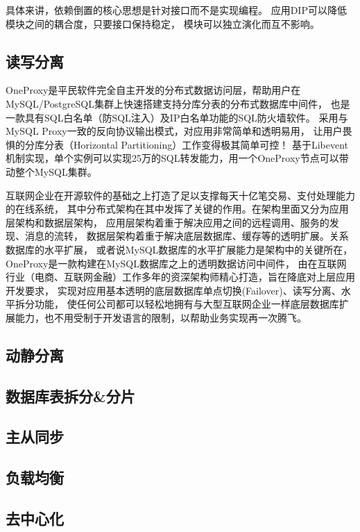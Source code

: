 \documentclass{book}
\begin{document}
具体来讲，依赖倒置的核心思想是针对接口而不是实现编程。
应用DIP可以降低模块之间的耦合度，只要接口保持稳定，
模块可以独立演化而互不影响。

\subsection{读写分离}

OneProxy是平民软件完全自主开发的分布式数据访问层，帮助用户在MySQL/PostgreSQL集群上快速搭建支持分库分表的分布式数据库中间件，
也是一款具有SQL白名单（防SQL注入）及IP白名单功能的SQL防火墙软件。
采用与MySQL Proxy一致的反向协议输出模式，对应用非常简单和透明易用，
让用户畏惧的分库分表（Horizontal Partitioning）工作变得极其简单可控！
基于Libevent机制实现，单个实例可以实现25万的SQL转发能力，用一个OneProxy节点可以带动整个MySQL集群。

互联网企业在开源软件的基础之上打造了足以支撑每天十亿笔交易、支付处理能力的在线系统，
其中分布式架构在其中发挥了关键的作用。在架构里面又分为应用层架构和数据层架构，
应用层架构着重于解决应用之间的远程调用、服务的发现、消息的流转，
数据层架构着重于解决底层数据库、缓存等的透明扩展。关系数据库的水平扩展，
或者说MySQL数据库的水平扩展能力是架构中的关键所在，OneProxy是一款构建在MySQL数据库之上的透明数据访问中间件，
由在互联网行业（电商、互联网金融）工作多年的资深架构师精心打造，旨在降底对上层应用开发要求，
实现对应用基本透明的底层数据库单点切换(Failover)、读写分离、水平拆分功能，
使任何公司都可以轻松地拥有与大型互联网企业一样底层数据库扩展能力，也不用受制于开发语言的限制，以帮助业务实现再一次腾飞。

\subsection{动静分离}

\subsection{数据库表拆分\&分片}

\subsection{主从同步}

\subsection{负载均衡}

\subsection{去中心化}
\end{document}

